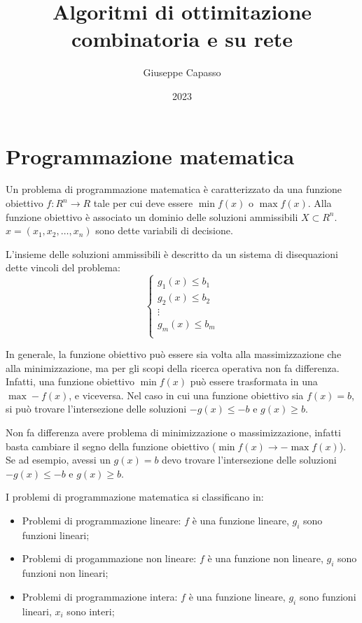 \documentclass{article}
\author{Giuseppe Capasso}
\title{Algoritmi di ottimitazione combinatoria e su rete}
\date{2023}
\begin{document}
\maketitle
\tableofcontents
\newpage

\section{Programmazione matematica}
Un problema di programmazione matematica è caratterizzato da una funzione 
obiettivo $f: R^n\rightarrow R$ tale per cui deve essere $\min f(x)$ o
$\max f(x)$.
Alla funzione obiettivo è associato un dominio delle soluzioni ammissibili 
$X\subset R^n$. $x=(x_1, x_2, \ldots, x_n)$ sono dette variabili di decisione.

L'insieme delle soluzioni ammissibili è descritto da un sistema di disequazioni
dette vincoli del problema:
\begin{equation*}
  \begin{cases}
    g_1(x) \leq b_1\\
    g_2(x) \leq b_2\\
    \vdots\\
    g_m(x) \leq b_m\\ 
  \end{cases}
\end{equation*}

In generale, la funzione obiettivo può essere sia volta alla massimizzazione che 
alla minimizzazione, ma per gli scopi della ricerca operativa non fa differenza.
Infatti, una funzione obiettivo $\min f(x)$ può essere trasformata in una 
$\max -f(x)$, e viceversa. Nel caso in cui una funzione obiettivo sia $f(x) = b$,
si può trovare l'intersezione delle soluzioni $-g(x)\leq -b$ e $g(x)\geq b$.

Non fa differenza avere problema di minimizzazione o massimizzazione, infatti
basta cambiare il segno della funzione obiettivo ($\min f(x) \rightarrow
-\max f(x)$). Se ad esempio, avessi un $g(x) = b$ 
devo trovare l'intersezione delle soluzioni $-g(x)\leq -b$ e $g(x)\geq b$.

I problemi di programmazione matematica si classificano in:
\begin{itemize}
\item Problemi di programmazione lineare: $f$ è una funzione lineare, $g_i$
  sono funzioni lineari; 
\item Problemi di progammazione non lineare: $f$ è una funzione non lineare,
  $g_i$ sono funzioni non lineari;
\item Problemi di programmazione intera: $f$ è una funzione lineare, $g_i$ sono
  funzioni lineari, $x_i$ sono interi;
\end{itemize}
\end{document}
